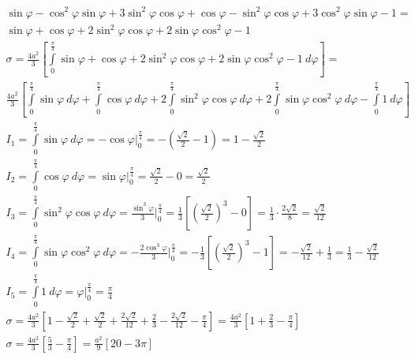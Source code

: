 \documentclass[a4paper,fleqn,12pt]{article}
\theoremstyle{definition}
\begin{document}
\begin{gather*}
\sin\varphi - \cos^2 \varphi \sin\varphi + 3\sin^2\varphi\cos\varphi 
+ \cos\varphi - \sin^2\varphi \cos\varphi + 3 \cos^2 \varphi \sin\varphi - 1 = \\
\sin \varphi + \cos \varphi + 2\sin^2 \varphi \cos \varphi + 2 \sin \varphi \cos^2 \varphi - 1 \\
\sigma = \frac{4a^2}{3} \left[ \int\limits_0 ^{\frac{\pi}{4}} 
\sin \varphi + \cos \varphi + 2\sin^2 \varphi \cos \varphi + 2 \sin \varphi \cos^2 \varphi - 1 \ d\varphi \right] = \\
\frac{4a^2}{3} \left[ 
\int\limits_0 ^{\frac{\pi}{4}} \sin \varphi \ d\varphi +
\int\limits_0 ^{\frac{\pi}{4}} \cos \varphi \ d\varphi + 
2\int\limits_0 ^{\frac{\pi}{4}} \sin^2 \varphi \cos \varphi \ d\varphi +
2\int\limits_0 ^{\frac{\pi}{4}} \sin \varphi \cos^2 \varphi \ d\varphi  -
\int\limits_0 ^{\frac{\pi}{4}} 1 \ d\varphi \right] \\
I_1 = \int\limits_0 ^{\frac{\pi}{4}} \sin \varphi \ d\varphi  = 
- \cos \varphi \Big|_0 ^{\frac{\pi}{4}} = -\left(\frac{\sqrt{2}}{2} - 1 \right) = 1 - \frac{\sqrt{2}}{2} \\
I_2 = \int\limits_0 ^{\frac{\pi}{4}} \cos \varphi \ d\varphi = 
\sin \varphi \Big|_0 ^{\frac{\pi}{4}} = \frac{\sqrt{2}}{2} - 0  = \frac{\sqrt{2}}{2} \\
I_3 = \int\limits_0 ^{\frac{\pi}{4}} \sin^2 \varphi \cos \varphi \ d\varphi = 
\frac{\sin^3 \varphi}{3} \Big|_0 ^{\frac{\pi}{4}} = \frac{1}{3} \left[ \left( \frac{\sqrt{2}}{2} \right) ^3 - 0 \right] = 
\frac{1}{3} \cdot \frac{2\sqrt{2}}{8} = \frac{\sqrt{2}}{12} \\
I_4 = \int\limits_0 ^{\frac{\pi}{4}} \sin \varphi \cos^2 \varphi \ d\varphi = 
-\frac{2 \cos^3 \varphi}{3} \Big|_0 ^{\frac{\pi}{4}}  = -\frac{1}{3} \left[ \left( \frac{\sqrt{2}}{2} \right) ^3 - 1 \right] = 
-\frac{\sqrt{2}}{12} + \frac{1}{3} = \frac{1}{3}-\frac{\sqrt{2}}{12} \\
I_5 = \int\limits_0 ^{\frac{\pi}{4}} 1 \ d\varphi = \varphi \Big|_0 ^{\frac{\pi}{4}} = \frac{\pi}{4} \\
\sigma  = \frac{4a^2}{3}  \left[ 1 - \frac{\sqrt{2}}{2}  + \frac{\sqrt{2}}{2} + \frac{2\sqrt{2}}{12} + \frac{2}{3}-\frac{2\sqrt{2}}{12} - \frac{\pi}{4} \right] = 
\frac{4a^2}{3}  \left[ 1 + \frac{2}{3} - \frac{\pi}{4} \right] \\
\sigma = \frac{4a^2}{3}  \left[\frac{5}{3} - \frac{\pi}{4} \right] = \frac{a^2}{9} \left[20 - 3\pi \right]
\end{gather*}
\end{document}
